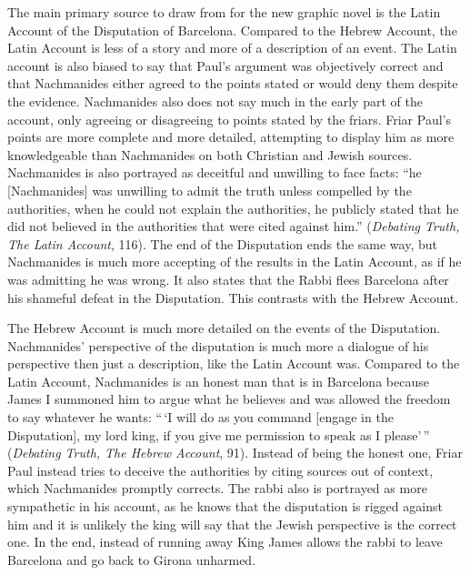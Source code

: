 \documentclass[12pt]{article}
\begin{document}
The main primary source to draw from for the new graphic novel is the Latin Account of the Disputation of Barcelona.
Compared to the Hebrew Account, the Latin Account is less of a story and more of a description of an event.
The Latin account is also biased to say that Paul's argument was objectively correct and that Nachmanides either agreed to the points stated or would deny them despite the evidence.
Nachmanides also does not say much in the early part of the account, only agreeing or disagreeing to points stated by the friars.
Friar Paul's points are more complete and more detailed, attempting to display him as more knowledgeable than Nachmanides on both Christian and Jewish sources.
Nachmanides is also portrayed as deceitful and unwilling to face facts:
``he [Nachmanides] was unwilling to admit the truth unless compelled by the authorities, when he could not explain the authorities, he publicly stated that he did not believed in the authorities that were cited against him.'' (\emph{Debating Truth, The Latin Account}, 116).
The end of the Disputation ends the same way, but Nachmanides is much more accepting of the results in the Latin Account, as if he was admitting he was wrong.
It also states that the Rabbi flees Barcelona after his shameful defeat in the Disputation.
This contrasts with the Hebrew Account.

The Hebrew Account is much more detailed on the events of the Disputation.
Nachmanides' perspective of the disputation is much more a dialogue of his perspective then just a description, like the Latin Account was.
Compared to the Latin Account, Nachmanides is an honest man that is in Barcelona because James I summoned him to argue what he believes and was allowed the freedom to say whatever he wants: ``\,`I will do as you command [engage in the Disputation], my lord king, if you give me permission to speak as I please'\,'' (\emph{Debating Truth, The Hebrew Account}, 91).
Instead of being the honest one, Friar Paul instead tries to deceive the authorities by citing sources out of context, which Nachmanides promptly corrects.
The rabbi also is portrayed as more sympathetic in his account, as he knows that the disputation is rigged against him and it is unlikely the king will say that the Jewish perspective is the correct one.
In the end, instead of running away King James allows the rabbi to leave Barcelona and go back to Girona unharmed.
\end{document}
